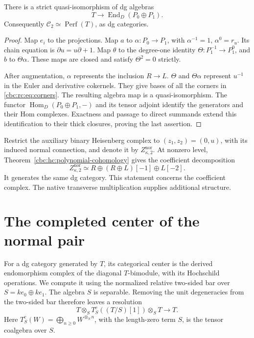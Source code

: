 \begin{theorem}\label{cbc:rc:thm:endomorphisms}
There is a strict quasi-isomorphism of dg algebras
\[
 T\longrightarrow\operatorname{End}_D(P_0\oplus P_1).
\]
Consequently \(\mathcal C_2\simeq\operatorname{Perf}(T)\), as dg categories.
\end{theorem}
\begin{proof}
Map \(e_i\) to the projections.  Map \(a\) to \(\alpha:P_0\to P_1\), with
\(\alpha^{-1}=1\), \(\alpha^0=r_u\).  Its chain equation is
\(\partial u=u\partial+1\).
Map \(\theta\) to the degree-one identity
\(\Theta:P_1^{-1}\to P_1^0\), and \(b\) to \(\Theta\alpha\).
These maps are closed and satisfy \(\Theta^2=0\) strictly.

After augmentation, \(\alpha\) represents the inclusion \(R\to L\).
\(\Theta\) and \(\Theta\alpha\) represent \(u^{-1}\) in the Euler and
derivative cokernels.  They give bases of all the corners in
\eqref{cbc:rc:eq:corners}.  The resulting algebra map is a quasi-isomorphism.
The functor \(\operatorname{Hom}_D(P_0\oplus P_1,-)\) and its tensor
adjoint identify the generators and their Hom complexes.  Exactness and
passage to direct summands extend this identification to their thick
closures, proving the last assertion.
\end{proof}

Restrict the auxiliary binary Heisenberg complex to
\((z_1,z_2)=(0,u)\), with its induced normal connection, and denote it
by \(Z^{\mathrm{nor}}_{\kappa,2}\).  At nonzero level,
Theorem~\ref{cbc:hc:polynomial-cohomology} gives the coefficient decomposition
\[
 Z^{\mathrm{nor}}_{\kappa,2}\simeq
 R\oplus(R\oplus L)[-1]\oplus L[-2].
\]
It generates the same dg category.  This statement concerns the
coefficient complex. The native transverse multiplication supplies
additional structure.

\section{The completed center of the normal pair}
\label{cbc:rc:subsec:centre}

For a dg category generated by \(T\), its categorical center is the
derived endomorphism complex of the diagonal \(T\)-bimodule, with its
Hochschild operations.  We compute it using the normalized relative
two-sided bar over \(S=k e_0\oplus k e_1\).
The algebra \(S\) is separable.  Removing the unit degeneracies from
the two-sided bar therefore leaves a resolution
\[
 T\otimes_S T^c_S((T/S)[1])\otimes_S T\longrightarrow T.
\]
Here \(T^c_S(W)=\bigoplus_{n\geq0}W^{\otimes_S n}\), with the
length-zero term \(S\), is the tensor coalgebra over \(S\).

